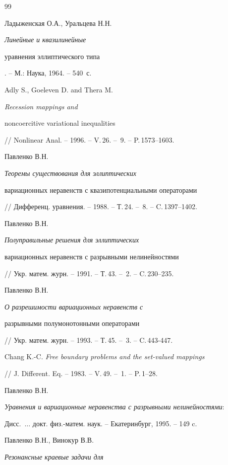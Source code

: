 \begin{thebibliography}{99}







Ладыженская О.А., Уральцева Н.Н. {\em Линейные и квазилинейные


уравнения эллиптического типа}. -- М.: Наука, 1964. -- 540~с.




Adly S., Goeleven D. and Thera M. {\em Recession mappings and


noncoercitive variational inequalities}


// Nonlinear Anal. -- 1996. -- V.\,26. -- \No\,9. -- P.\,1573--1603.




Павленко В.Н. {\em Теоремы  существования для эллиптических


вариационных неравенств с квазипотенциальными операторами}


// Дифференц. уравнения. -- 1988. -- Т.\,24. -- \No\,8. -- C.\,1397--1402.




Павленко В.Н. {\em Полуправильные решения для эллиптических


вариационных неравенств с разрывными нелинейностями}


// Укр. матем. журн. -- 1991. -- Т.\,43. -- \No\,2. -- C.\,230--235.




Павленко В.Н. {\em О разрешимости вариационных неравенств с


разрывными полумонотонными операторами}


// Укр. матем. журн. -- 1993. -- Т.\,45. -- \No\,3. -- C.\,443-447.




Chang K.-C. {\em Free boundary problems and the set-valued mappings}


// J. Different. Eq. -- 1983. -- V.\,49. -- \No\,1. -- P.\,1--28.




Павленко В.Н.


{\em Уравнения и вариационные неравенства с разрывными нелинейностями}:


Дисс.~$\dotsc$ докт. физ.-матем. наук. -- Екатеринбург, 1995. -- 149 c.




Павленко В.Н., Винокур В.В. {\em Резонансные краевые задачи для


}
\end{thebibliography}
